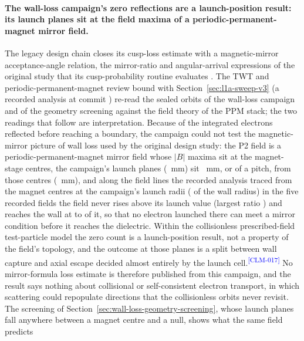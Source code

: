 \documentclass[11pt]{article}
\newcommand{\EvidenceClaim}[2]{#2\textsuperscript{\textcolor{blue}{[#1]}}}
\begin{document}
\paragraph{The wall-loss campaign's zero reflections are a launch-position
result: its launch planes sit at the field maxima of a periodic-permanent-magnet
mirror field.}
The legacy design chain closes its cusp-loss estimate with a magnetic-mirror
acceptance-angle relation, the mirror-ratio and angular-arrival expressions of
the original study that its cusp-probability routine evaluates
\cite{Muffatti2017}. The TWT and periodic-permanent-magnet review bound with
Section~\ref{sec:l1a-sweep-v3} (a recorded analysis at commit
\texttt{\SwtLiteratureCommit}) re-read the sealed orbits of the wall-loss
campaign and of the geometry screening against the field theory of the PPM
stack; the two readings that follow are interpretation.
\EvidenceClaim{CLM-017}{Because \WlfPooledReflected{} of the \WlfPooledTrials{}
integrated electrons reflected before reaching a boundary, the campaign could
not test the magnetic-mirror picture of wall loss used by the original design
study: the P2 field is a periodic-permanent-magnet mirror field whose $|B|$
maxima sit at the magnet-stage centres, the campaign's \SwtVFourLaunchCells{}
launch planes (\SwtVFourLaunchZMm{}~mm) sit \SwtVFourLaunchOffsetMm{}~mm, or
\SwtVFourLaunchOffsetPitch{} of a pitch, from those centres
(\SwtPTwoStageCentresMm{}~mm), and along the \SwtPpmLineCount{} field lines the
recorded analysis traced from the magnet centres at the campaign's launch radii
(\SwtVFourLaunchRadiiFraction{} of the wall radius) in the five recorded fields
the field never rises above its launch value (largest ratio
\SwtPpmLineMaxOverLaunchMax) and reaches the wall at \SwtPpmLineWallOverLaunchMin{}
to \SwtPpmLineWallOverLaunchMax{} of it, so that no electron launched there can
meet a mirror condition before it reaches the dielectric. Within the
collisionless prescribed-field test-particle model the zero count is a
launch-position result, not a property of the field's topology, and the outcome
at those planes is a split between wall capture and axial escape decided almost
entirely by the launch cell.} No mirror-formula loss estimate is therefore
published from this campaign, and the result says nothing about collisional or
self-consistent electron transport, in which scattering could repopulate
directions that the collisionless orbits never revisit. The screening of
Section~\ref{sec:wall-loss-geometry-screening}, whose launch planes fall
anywhere between a magnet centre and a null, shows what the same field predicts
\end{document}
